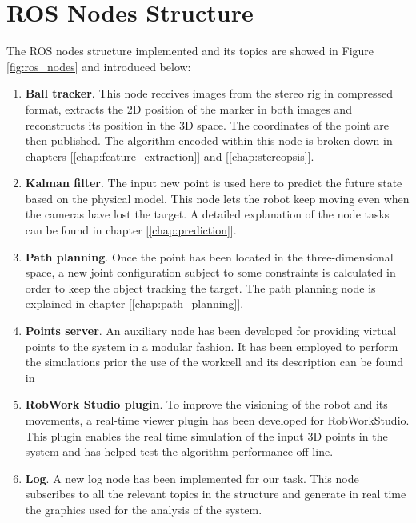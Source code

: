 \chapter{ROS Nodes Structure} %
\label{chap:ros_nodes_structure}
The ROS nodes structure implemented and its topics are showed in Figure \ref{fig:ros_nodes} and introduced below:
\begin{enumerate}
	\item \textbf{Ball tracker}. This node receives images from the stereo rig in compressed format, extracts the 2D position of the marker in both images and reconstructs its position in the 3D space. 
	The coordinates of the point are then published. The algorithm encoded within this node is broken down in chapters [\ref{chap:feature_extraction}] and [\ref{chap:stereopsis}].
	\item \textbf{Kalman filter}. The input new point is used here to predict the future state based on the physical model. This node lets the robot keep moving even when the cameras have lost the target. 
	A detailed explanation of the node tasks can be found in chapter [\ref{chap:prediction}].
	\item \textbf{Path planning}. Once the point has been located in the three-dimensional space, a new joint configuration subject to some constraints is calculated in order to keep the object tracking the target. 
	The path planning node is explained in chapter [\ref{chap:path_planning}].
	\item \textbf{Points server}. An auxiliary node has been developed for providing virtual points to the system in a modular fashion. 
	It has been employed to perform the simulations prior the use of the workcell and its description can be found in 
	\item \textbf{RobWork Studio plugin}. To improve the visioning of the robot and its movements, a real-time viewer plugin has been developed for RobWorkStudio. 
	This plugin enables the real time simulation of the input 3D points in the system and has helped test the algorithm performance off line.
	\item \textbf{Log}. A new log node has been implemented for our task. 
	This node subscribes to all the relevant topics in the structure and generate in real time the graphics used for the analysis of the system.
\end{enumerate}

